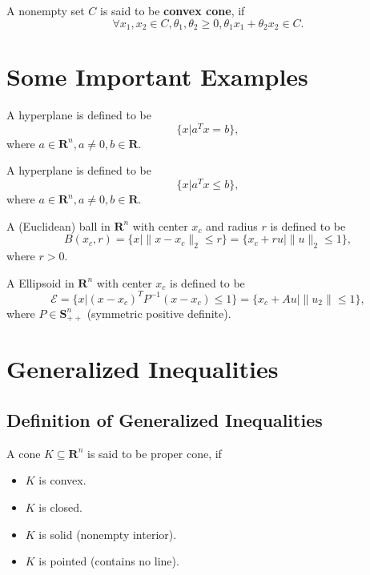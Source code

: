 \begin{definition}
    A nonempty set $C$ is said to be \textbf{convex cone}, if $$\forall x_1,x_2\in C, \theta_1,\theta_2\geq 0,\theta_1 x_1+\theta_2 x_2\in C.$$
\end{definition}

\section{Some Important Examples}

\begin{definition}[Hyperplane]
    A hyperplane is defined to be $$\{x|a^Tx=b\},$$ where $a\in\mathbf{R}^n,a\neq 0,b\in\mathbf{R}$.
\end{definition}

\begin{definition}[Halfspace]
    A hyperplane is defined to be $$\{x|a^Tx\leq b\},$$ where $a\in\mathbf{R}^n,a\neq 0,b\in\mathbf{R}$.
\end{definition}

\begin{definition}
    A (Euclidean) ball in $\mathbf{R}^n$ with center $x_c$ and radius $r$ is defined to be $$B(x_c,r)=\{x\vert\|x-x_c\|_2\leq r\}=\{x_c+ru\vert\|u\|_2\leq 1\},$$ where $r>0$.
\end{definition}

\begin{definition}[Ellipsoid]
    A Ellipsoid in $\mathbf{R}^n$ with center $x_c$ is defined to be $$\mathcal{E}=\{x\vert(x-x_c)^TP^{-1}(x-x_c)\leq 1\}=\{x_c+Au\vert \|u_2\|\leq 1\},$$ where $P\in\mathbf{S}^{n}_{++}$ (symmetric positive definite).
\end{definition}

\section{Generalized Inequalities}

\subsection{Definition of Generalized Inequalities}

\begin{definition} \label{def:proper-cone}
    A cone $K\subseteq\mathbf{R}^n$ is said to be proper cone, if
    \begin{itemize}
        \item $K$ is convex.
        \item $K$ is closed.
        \item $K$ is solid (nonempty interior).
        \item $K$ is pointed (contains no line).
    \end{itemize}
\end{definition}


